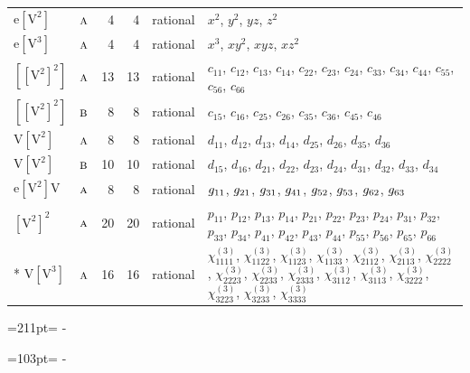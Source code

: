 \documentclass[10pt,a4paper]{article}
\newcommand{\needspace}[1]{\par\penalty-100\begingroup\dimen0=#1\relax\dimen2=\pagegoal
  \advance\dimen2-\pagetotal\ifdim\dimen0>\dimen2\relax\ifdim\dimen2>0pt\vfil\break\fi\fi
  \endgroup}
\numberwithin{equation}{section}
\newcommand{\irr}[1]{\text{\normalfont\scshape #1}}
\newcommand{\jahn}[1]{\mathrm{#1}}
\newlength{\fillwidth}\newlength{\cellwidth}\newlength{\colwidth}
\begin{document}
{\begin{longtable}{@{}llrrl>{\RaggedRight\arraybackslash}p{\fillwidth}@{}}
$\jahn{e[V^{2}]}$ & $\irr{a}$ & 4 & 4 & rational & $x^{2}$, $y^{2}$, $yz$, $z^{2}$\\
$\jahn{e[V^{3}]}$ & $\irr{a}$ & 4 & 4 & rational & $x^{3}$, $xy^{2}$, $xyz$, $xz^{2}$\\
$\jahn{[[V^{2}]^{2}]}$ & $\irr{a}$ & 13 & 13 & rational & $c_{11}$, $c_{12}$, $c_{13}$, $c_{14}$, $c_{22}$, $c_{23}$, $c_{24}$, $c_{33}$, $c_{34}$, $c_{44}$, $c_{55}$, $c_{56}$, $c_{66}$\\
$\jahn{[[V^{2}]^{2}]}$ & $\irr{b}$ & 8 & 8 & rational & $c_{15}$, $c_{16}$, $c_{25}$, $c_{26}$, $c_{35}$, $c_{36}$, $c_{45}$, $c_{46}$\\
$\jahn{V[V^{2}]}$ & $\irr{a}$ & 8 & 8 & rational & $d_{11}$, $d_{12}$, $d_{13}$, $d_{14}$, $d_{25}$, $d_{26}$, $d_{35}$, $d_{36}$\\
$\jahn{V[V^{2}]}$ & $\irr{b}$ & 10 & 10 & rational & $d_{15}$, $d_{16}$, $d_{21}$, $d_{22}$, $d_{23}$, $d_{24}$, $d_{31}$, $d_{32}$, $d_{33}$, $d_{34}$\\
$\jahn{e[V^{2}]V}$ & $\irr{a}$ & 8 & 8 & rational & $\mathnormal{g}_{11}$, $\mathnormal{g}_{21}$, $\mathnormal{g}_{31}$, $\mathnormal{g}_{41}$, $\mathnormal{g}_{52}$, $\mathnormal{g}_{53}$, $\mathnormal{g}_{62}$, $\mathnormal{g}_{63}$\\
$\jahn{[V^{2}]^{2}}$ & $\irr{a}$ & 20 & 20 & rational & $p_{11}$, $p_{12}$, $p_{13}$, $p_{14}$, $p_{21}$, $p_{22}$, $p_{23}$, $p_{24}$, $p_{31}$, $p_{32}$, $p_{33}$, $p_{34}$, $p_{41}$, $p_{42}$, $p_{43}$, $p_{44}$, $p_{55}$, $p_{56}$, $p_{65}$, $p_{66}$\\*
$\jahn{V[V^{3}]}$ & $\irr{a}$ & 16 & 16 & rational & $\chi^{(3)}_{1111}$, $\chi^{(3)}_{1122}$, $\chi^{(3)}_{1123}$, $\chi^{(3)}_{1133}$, $\chi^{(3)}_{2112}$, $\chi^{(3)}_{2113}$, $\chi^{(3)}_{2222}$, $\chi^{(3)}_{2223}$, $\chi^{(3)}_{2233}$, $\chi^{(3)}_{2333}$, $\chi^{(3)}_{3112}$, $\chi^{(3)}_{3113}$, $\chi^{(3)}_{3222}$, $\chi^{(3)}_{3223}$, $\chi^{(3)}_{3233}$, $\chi^{(3)}_{3333}$\\
\bottomrule\end{longtable}}
\needspace{211pt}
\needspace{103pt}
\end{document}
